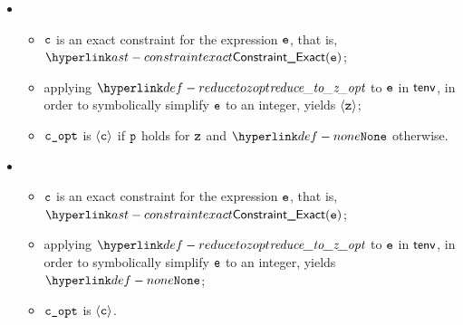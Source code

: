 \ProseParagraph
\OneApplies
\begin{itemize}
  \item {}
  \begin{itemize}
    \item $\texttt{c}$ is an exact constraint for the expression $\texttt{e}$, that is, $\ConstraintExact(\ve)$;
    \item applying $\reducetozopt$ to $\texttt{e}$ in $\textsf{tenv}$, in order to symbolically simplify $\texttt{e}$ to an integer,
          yields $\langle\texttt{z}\rangle$;
    \item $\texttt{c\_opt}$ is $\langle\texttt{c}\rangle$ if $\texttt{p}$ holds for $\texttt{z}$ and $\None$ otherwise.
  \end{itemize}

  \item {}
  \begin{itemize}
    \item $\texttt{c}$ is an exact constraint for the expression $\texttt{e}$, that is, $\ConstraintExact(\ve)$;
    \item applying $\reducetozopt$ to $\texttt{e}$ in $\textsf{tenv}$, in order to symbolically simplify $\texttt{e}$ to an integer,
          yields $\None$;
    \item $\texttt{c\_opt}$ is $\langle\texttt{c}\rangle$.
  \end{itemize}


\end{itemize}
